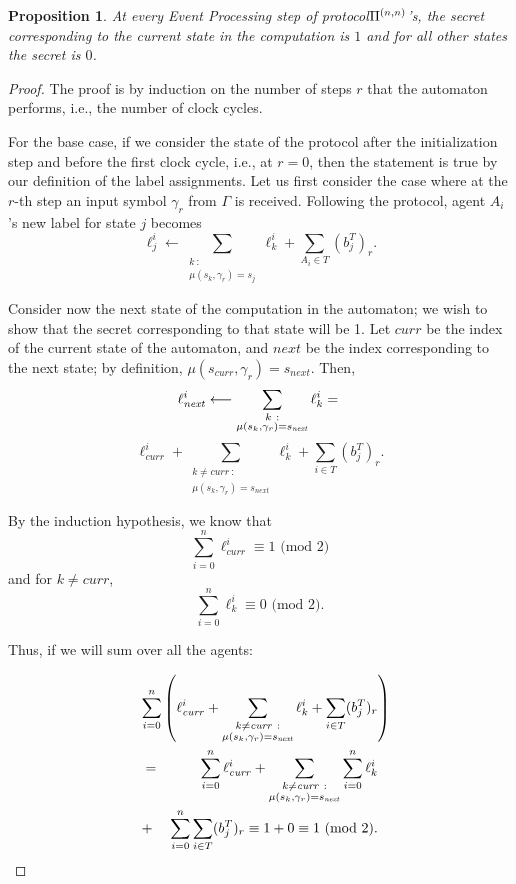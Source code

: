 \documentclass[letterpaper,11pt]{article}
\newcommand{\nnPi}{{\rm {\Pi}}^{(n,n)}}
\newcommand{\curr}{\mathit{curr}}
\newcommand{\next}{\mathit{next}}
\newtheorem{proposition}[theorem]{Proposition}
\begin{document}
\begin{proposition}
\label{prop-all}
At every Event Processing step of protocol$\nnPi$'s,
the secret corresponding
to the current state in the computation is $1$ and for all other states 
the secret is $0$.
\end{proposition}
\begin {proof}
The proof is
by induction on the number of steps $r$ that the automaton performs, i.e., 
the number of clock cycles.

For the base case, if we consider the state of the protocol
after the initialization step and before the first clock cycle, i.e.,
at $r=0$, then the statement is true by our definition of the label
assignments. Let us first consider the case where at the $r$-th step
an input symbol $\gamma _r$ from $\Gamma$ is received.  
Following the protocol,
agent $A_i$'s new label for state $j$ becomes
$$ \ell ^i_j \longleftarrow
\sum_{\substack{k~ :\\ \mu(s_k, \gamma_r)=s_j}} \ell^i_k + \sum _{A_i \in
T} (b_j^T)_r.
$$

Consider now the next state of the computation in the automaton; we
wish to show that the secret corresponding to that state will be 1.
Let $\curr$ be the index of the current state of the automaton, and
$\next$ be the index corresponding to the next state; by definition,
$\mu(s_{\curr},\gamma_r)=s_{\next}$. Then, 
$$\ell^i_{\next} \longleftarrow
\sum_{\substack{k~:\\ \mu(s_k, \gamma_r)=s_{\next}}} \ell^i_k = \\
$$ 
$$
\ell^i_{\curr}+ \sum_{\substack{k\neq \curr~:\\ \mu(s_k,
\gamma_r)=s_{\next}}} \ell^i_k + \sum _{i \in T} (b_j^T)_r.$$ 

By the induction hypothesis, we know that 
$$\sum_{i=0}^n \ell^i_{\curr} \equiv 1
\mbox{ (mod 2)}$$ 
and for $k\neq \curr$, 
$$\sum_{i=0}^n \ell^i_k \equiv 0 \mbox{ (mod 2)}.$$ 

\noindent Thus, if we will sum over all the agents:

\begin{eqnarray*}
\lefteqn{ \sum_{i=0}^n \left( \ell^i_{\curr}+  \sum_{\substack{k\neq \curr~:\\ \mu(s_k, \gamma_r)=s_{\next}}} \ell^i_k + \sum _{i \in T} (b_j^T)_r \right)} \\
&=& \sum_{i=0}^n  \ell^i_{\curr} + \sum_{\substack{k \neq \curr~:\\ \mu(s_k, \gamma_r)=s_{\next}}} \sum_{i=0}^n \ell^i_k  \\
&+& \sum_{i=0}^n \sum _{i \in T} (b_j^T)_r  \equiv 1 + 0  \equiv 1 \mbox{ (mod 2)}.
\end{eqnarray*}


\end{proof}
\end{document}
